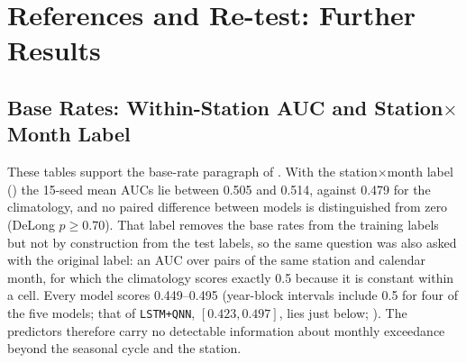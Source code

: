 \documentclass[11pt,a4paper]{article}
\begin{document}
\begin{table}[htbp]
\centering
\caption{Finite-shot inference of \texttt{LSTM+QNN} (15 seeds, 50 repetitions per budget). Loss: exact minus finite-shot 15-seed mean AUC; worst seed: largest loss of one seed's mean over repetitions; shot SD of one model and of the seed mean.}
\label{tab:shots}
{\small
{}}
\end{table}

\section{References and Re-test: Further Results}
\label{app:refs}

\subsection{Base Rates: Within-Station AUC and Station$\times$Month Label}
\label{app:baserates}

These tables support the base-rate paragraph of . With the station$\times$month label () the 15-seed mean AUCs lie between 0.505 and 0.514, against 0.479 for the climatology, and no paired difference between models is distinguished from zero (DeLong $p\ge0.70$). That label removes the base rates from the training labels but not by construction from the test labels, so the same question was also asked with the original label: an AUC over pairs of the same station and calendar month, for which the climatology scores exactly 0.5 because it is constant within a cell. Every model scores 0.449--0.495 (year-block intervals include 0.5 for four of the five models; that of \texttt{LSTM+QNN}, $[0.423,0.497]$, lies just below; ). The predictors therefore carry no detectable information about monthly exceedance beyond the seasonal cycle and the station.
\end{document}
